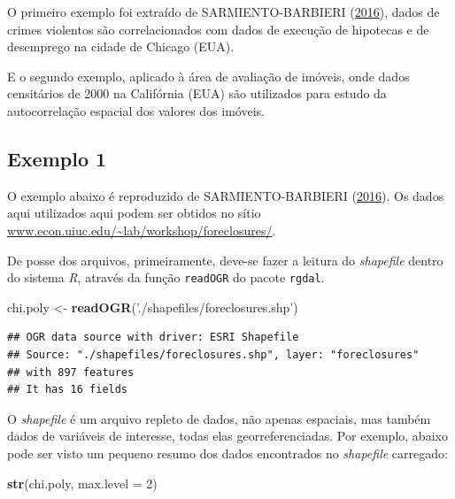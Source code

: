 \documentclass[12pt,]{article}
\newenvironment{Shaded}{\begin{snugshade}}{\end{snugshade}}
\newcommand{\KeywordTok}[1]{\textcolor[rgb]{0.13,0.29,0.53}{\textbf{#1}}}
\newcommand{\DataTypeTok}[1]{\textcolor[rgb]{0.13,0.29,0.53}{#1}}
\newcommand{\DecValTok}[1]{\textcolor[rgb]{0.00,0.00,0.81}{#1}}
\newcommand{\StringTok}[1]{\textcolor[rgb]{0.31,0.60,0.02}{#1}}
\newcommand{\NormalTok}[1]{#1}
\begin{document}
O primeiro exemplo foi extraído de SARMIENTO-BARBIERI
(\protect\hyperlink{ref-sarmiento-barbieri}{2016}), dados de crimes
violentos são correlacionados com dados de execução de hipotecas e de
desemprego na cidade de Chicago (EUA).

E o segundo exemplo, aplicado à área de avaliação de imóveis, onde dados
censitários de 2000 na Califórnia (EUA) são utilizados para estudo da
autocorrelação espacial dos valores dos imóveis.

\subsection{Exemplo 1}\label{exemplo-1}

O exemplo abaixo é reproduzido de SARMIENTO-BARBIERI
(\protect\hyperlink{ref-sarmiento-barbieri}{2016}). Os dados aqui
utilizados aqui podem ser obtidos no sítio
\href{http://www.econ.uiuc.edu/~lab/workshop/foreclosures/}{www.econ.uiuc.edu/\textasciitilde{}lab/workshop/foreclosures/}.

De posse dos arquivos, primeiramente, deve-se fazer a leitura do
\emph{shapefile} dentro do sistema \emph{R}, através da função
\texttt{readOGR} do pacote \texttt{rgdal}.

\begin{Shaded}
\begin{Highlighting}[]
\NormalTok{chi.poly <-}\StringTok{ }\KeywordTok{readOGR}\NormalTok{(}\StringTok{'./shapefiles/foreclosures.shp'}\NormalTok{)}
\end{Highlighting}
\end{Shaded}

\begin{verbatim}
## OGR data source with driver: ESRI Shapefile 
## Source: "./shapefiles/foreclosures.shp", layer: "foreclosures"
## with 897 features
## It has 16 fields
\end{verbatim}

O \emph{shapefile} é um arquivo repleto de dados, não apenas espaciais,
mas também dados de variáveis de interesse, todas elas
georreferenciadas. Por exemplo, abaixo pode ser visto um pequeno resumo
dos dados encontrados no \emph{shapefile} carregado:

\begin{Shaded}
\begin{Highlighting}[]
\KeywordTok{str}\NormalTok{(chi.poly, }\DataTypeTok{max.level =} \DecValTok{2}\NormalTok{)}
\end{Highlighting}
\end{Shaded}
\end{document}
